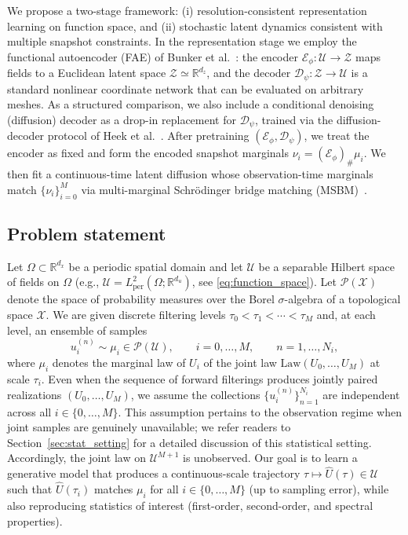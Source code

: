 \documentclass[review,onefignum,onetabnum]{siamart250211}
\newcommand{\R}{\mathbb{R}}
\newcommand{\cX}{\mathcal{X}}
\newcommand{\1}{\mathbf{1}}
\newcommand{\cU}{\mathcal{U}}
\newcommand{\cZ}{\mathcal{Z}}
\newcommand{\cP}{\mathcal{P}}
\newcommand{\cE}{\mathcal{E}}
\newcommand{\cD}{\mathcal{D}}
\begin{document}
We propose a two-stage framework: (i) resolution-consistent representation learning on function space, and (ii) stochastic latent dynamics consistent with multiple snapshot constraints. In the representation stage we employ the functional autoencoder (\textsc{FAE}) of Bunker et al.~\cite{bunker2025fae}: the encoder $\cE_\phi:\cU\to\cZ$ maps fields to a Euclidean latent space $\cZ\simeq\R^{d_z}$, and the decoder $\cD_\psi:\cZ\to\cU$ is a standard nonlinear coordinate network that can be evaluated on arbitrary meshes. As a structured comparison, we also include a conditional denoising (diffusion) decoder as a drop-in replacement for $\cD_\psi$, trained via the diffusion-decoder protocol of Heek et al.~\cite{heek2026ul}. After pretraining $(\cE_\phi,\cD_\psi)$, we treat the encoder as fixed and form the encoded snapshot marginals $\nu_i=(\cE_\phi)_\#\mu_i$. We then fit a continuous-time latent diffusion whose observation-time marginals match $\{\nu_i\}_{i=0}^M$ via multi-marginal Schr\"odinger bridge matching (\textsc{MSBM})~\cite{park2025msbm}.

\subsection{Problem statement}
Let $\Omega\subset\R^{d_x}$ be a periodic spatial domain and let $\cU$ be a separable Hilbert space of fields on $\Omega$ (e.g., $\cU=L_{\mathrm{per}}^2(\Omega;\R^{d_u})$, see \eqref{eq:function_space}). Let $\cP(\cX)$ denote the space of probability measures over the Borel $\sigma$-algebra of a topological space $\cX$. We are given discrete filtering levels $\tau_0<\tau_1<\cdots<\tau_M$ and, at each level, an ensemble of samples
\begin{equation}
u_i^{(n)} \sim \mu_i \in \cP(\cU),
\qquad i=0,\dots,M,
\qquad n=1,\dots,N_i,
\label{eq:data_marginals}
\end{equation}
where $\mu_i$ denotes the marginal law of $U_i$ of the joint law $\mathrm{Law}(U_0, \dots, U_M)$ at scale $\tau_i$. Even when the sequence of forward filterings produces jointly paired realizations $(U_0,\dots,U_M)$, we assume the collections $\{u_i^{(n)}\}_{n=1}^{N_i}$ are independent across all $i\in\{0,\dots,M\}$. This assumption pertains to the observation regime when joint samples are genuinely unavailable; we refer readers to Section~\ref{sec:stat_setting} for a detailed discussion of this statistical setting. Accordingly, the joint law on $\cU^{M+1}$ is unobserved. Our goal is to learn a generative model that produces a continuous-scale trajectory $\tau\mapsto \widehat U(\tau)\in\cU$ such that $\widehat U(\tau_i)$ matches $\mu_i$ for all $i\in\{0,\dots,M\}$ (up to sampling error), while also reproducing statistics of interest (first-order, second-order, and spectral properties).
\end{document}
